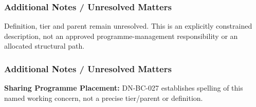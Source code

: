 \subsubsection*{Additional Notes / Unresolved Matters}

Definition, tier and parent remain unresolved. This is an explicitly constrained description, not an approved programme-management responsibility or an allocated structural path.

\subsubsection*{Additional Notes / Unresolved Matters}
\textbf{Sharing Programme Placement:} DN-BC-027 establishes spelling of this named working concern, not a precise tier/parent or definition.

